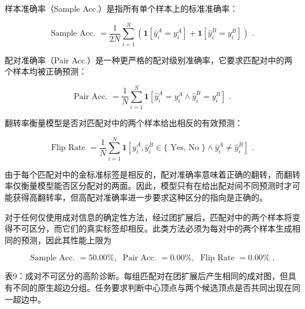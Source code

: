 \documentclass[10pt]{article}
\begin{document}
样本准确率（Sample Acc.）是指所有单个样本上的标准准确率：

\[
\text{ Sample Acc. } = \frac{1}{2N}\mathop{\sum }\limits_{{i = 1}}^{N}\left( {\mathbf{1}\left\lbrack  {{\widehat{y}}_{i}^{A} = {y}_{i}^{A}}\right\rbrack   + \mathbf{1}\left\lbrack  {{\widehat{y}}_{i}^{B} = {y}_{i}^{B}}\right\rbrack  }\right) \text{ . } \tag{20}
\]

配对准确率（Pair Acc.）是一种更严格的配对级别准确率，它要求匹配对中的两个样本均被正确预测：

\[
\text{ Pair Acc. } = \frac{1}{N}\mathop{\sum }\limits_{{i = 1}}^{N}\mathbf{1}\left\lbrack  {{\widehat{y}}_{i}^{A} = {y}_{i}^{A} \land  {\widehat{y}}_{i}^{B} = {y}_{i}^{B}}\right\rbrack  \text{ . } \tag{21}
\]

翻转率衡量模型是否对匹配对中的两个样本给出相反的有效预测：

\[
\text{ Flip Rate } = \frac{1}{N}\mathop{\sum }\limits_{{i = 1}}^{N}\mathbf{1}\left\lbrack  {{\widehat{y}}_{i}^{A},{\widehat{y}}_{i}^{B} \in  \{ \text{ Yes, No }\}  \land  {\widehat{y}}_{i}^{A} \neq  {\widehat{y}}_{i}^{B}}\right\rbrack  \text{ . } \tag{22}
\]

由于每个匹配对中的金标准标签是相反的，配对准确率意味着正确的翻转，而翻转率仅衡量模型能否区分配对的两面。因此，模型只有在给出配对间不同预测时才可能获得高翻转率，但高配对准确率进一步要求这种区分的指向是正确的。

对于任何仅使用成对信息的确定性方法，经过团扩展后，匹配对中的两个样本将变得不可区分，而它们的真实标签却相反。此类方法必须为每对中的两个样本生成相同的预测，因此其性能上限为

\[
\text{ Sample Acc. } = {50.00}\% ,\;\text{ Pair Acc. } = {0.00}\% ,\;\text{ Flip Rate } = {0.00}\% \text{ . } \tag{23}
\]

表9：成对不可区分的高阶诊断。每组匹配对在团扩展后产生相同的成对图，但具有不同的原生超边分组。任务要求判断中心顶点与两个候选顶点是否共同出现在同一超边中。

\begin{center}
\end{center}
\end{document}
